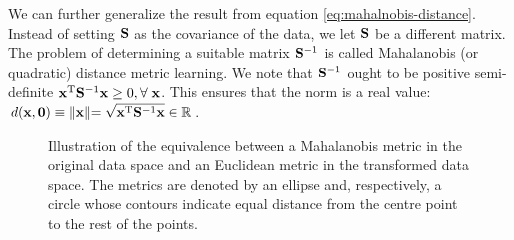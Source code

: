 We can further generalize the result from equation \eqref{eq:mahalnobis-distance}.
Instead of setting $\mathbf{S}$ as the covariance of the data, we let $\mathbf{S}$ be a different matrix. The problem of determining a suitable matrix
$\mathbf{S}^{-1}$ is called Mahalanobis (or quadratic) distance metric learning. We note that $\mathbf{S}^{-1}$ ought to be positive semi-definite $\mathbf{x}^\textrm{T}\mathbf{S}^{-1}\mathbf{x} \geq 0, \forall\;\mathbf{x}$. This ensures that the norm is a real value: $d(\mathbf{x},\mathbf{0})\equiv\lVert \mathbf{x}\lVert = \sqrt{\mathbf{x}^\textrm{T}\mathbf{S}^{-1}\mathbf{x}}\in\mathbb{R}$.



\begin{figure}
		 \centering
			    \hspace{0.02\textwidth}
		\caption{Illustration of the equivalence between a Mahalanobis metric in the original data space and an Euclidean metric in the transformed data space. The metrics are denoted by an ellipse and, respectively, a circle whose contours indicate equal distance from the centre point to the rest of the points.}
		\label{fig:mahalanobis-euclidean}
	\end{figure}

